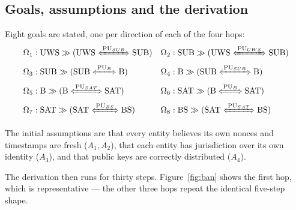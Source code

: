 \subsection{Goals, assumptions and the derivation}

Eight goals are stated, one per direction of each of the four hops:
\begin{align}
\Omega_1&: \mathrm{UWS} \gg (\mathrm{UWS} \xLeftrightarrow{\PU_{SUB}} \mathrm{SUB}) &
\Omega_2&: \mathrm{SUB} \gg (\mathrm{UWS} \xLeftrightarrow{\PU_{UWS}} \mathrm{SUB}) \notag\\
\Omega_3&: \mathrm{SUB} \gg (\mathrm{SUB} \xLeftrightarrow{\PU_{B}} \mathrm{B}) &
\Omega_4&: \mathrm{B} \gg (\mathrm{SUB} \xLeftrightarrow{\PU_{SUB}} \mathrm{B}) \notag\\
\Omega_5&: \mathrm{B} \gg (\mathrm{B} \xLeftrightarrow{\PU_{SAT}} \mathrm{SAT}) &
\Omega_6&: \mathrm{SAT} \gg (\mathrm{B} \xLeftrightarrow{\PU_{B}} \mathrm{SAT}) \notag\\
\Omega_7&: \mathrm{SAT} \gg (\mathrm{SAT} \xLeftrightarrow{\PU_{BS}} \mathrm{BS}) &
\Omega_8&: \mathrm{BS} \gg (\mathrm{SAT} \xLeftrightarrow{\PU_{SAT}} \mathrm{BS}) \notag
\end{align}

The initial assumptions are that every entity believes its own nonces and timestamps are
fresh ($A_1, A_2$), that each entity has jurisdiction over its own identity ($A_3$), and
that public keys are correctly distributed ($A_4$).

The derivation then runs for thirty steps. Figure~\ref{fig:ban} shows the first hop, which
is representative --- the other three hops repeat the identical five-step shape.

